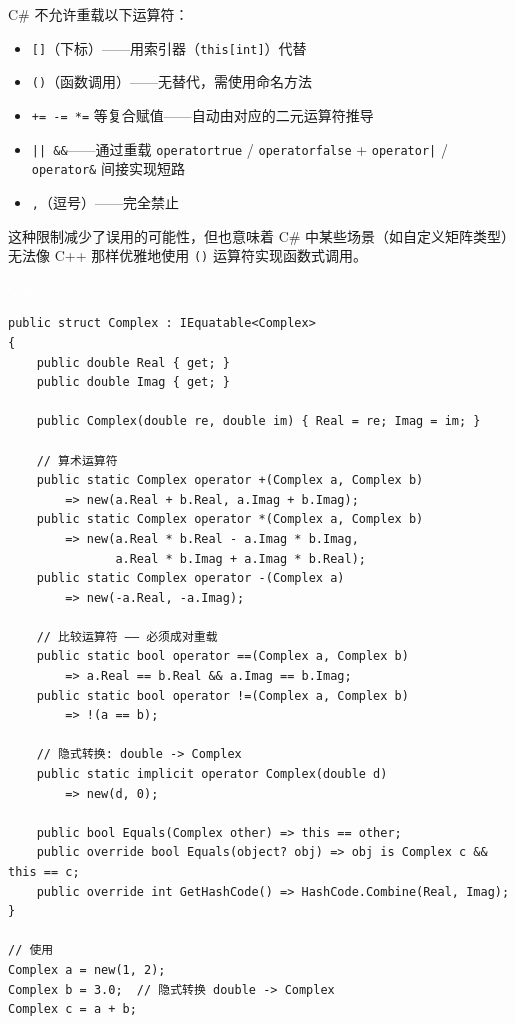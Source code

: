 \documentclass[12pt,a4paper,fontset=fandol]{ctexbook}
\newcommand{\cpp}[1]{C++#1}
\newcommand{\csharp}{C\#}
\newcommand{\Op}[1]{\texttt{operator#1}}
\newcommand{\csharplabel}{%
  \noindent\begin{tcolorbox}[sharp corners,colback=csharpheadbg,colframe=csharpheadbg,
    left=6pt,right=6pt,top=2pt,bottom=2pt,boxrule=0pt]
  \textcolor{white}{\small\bfseries\sffamily C\#}\end{tcolorbox}%
}
\begin{document}
\begin{compare}[title=C\# 不能重载但 C++ 可以的运算符]
\csharp{} 不允许重载以下运算符：

\begin{itemize}
  \item \texttt{[]}（下标）——用索引器（\texttt{this[int]}）代替
  \item \texttt{()}（函数调用）——无替代，需使用命名方法
  \item \texttt{+= -= *=} 等复合赋值——自动由对应的二元运算符推导
  \item \texttt{|| \&\&}——通过重载 \Op{true} / \Op{false} + \Op{|} / \Op{\&} 间接实现短路
  \item \texttt{,}（逗号）——完全禁止
\end{itemize}

这种限制减少了误用的可能性，但也意味着 \csharp{} 中某些场景（如自定义矩阵类型）无法像 \cpp{} 那样优雅地使用 \texttt{()} 运算符实现函数式调用。
\end{compare}

\csharplabel

\begin{lstlisting}[language=CSharp]
public struct Complex : IEquatable<Complex>
{
    public double Real { get; }
    public double Imag { get; }

    public Complex(double re, double im) { Real = re; Imag = im; }

    // 算术运算符
    public static Complex operator +(Complex a, Complex b)
        => new(a.Real + b.Real, a.Imag + b.Imag);
    public static Complex operator *(Complex a, Complex b)
        => new(a.Real * b.Real - a.Imag * b.Imag,
               a.Real * b.Imag + a.Imag * b.Real);
    public static Complex operator -(Complex a)
        => new(-a.Real, -a.Imag);

    // 比较运算符 —— 必须成对重载
    public static bool operator ==(Complex a, Complex b)
        => a.Real == b.Real && a.Imag == b.Imag;
    public static bool operator !=(Complex a, Complex b)
        => !(a == b);

    // 隐式转换: double -> Complex
    public static implicit operator Complex(double d)
        => new(d, 0);

    public bool Equals(Complex other) => this == other;
    public override bool Equals(object? obj) => obj is Complex c && this == c;
    public override int GetHashCode() => HashCode.Combine(Real, Imag);
}

// 使用
Complex a = new(1, 2);
Complex b = 3.0;  // 隐式转换 double -> Complex
Complex c = a + b;
\end{lstlisting}
\end{document}

